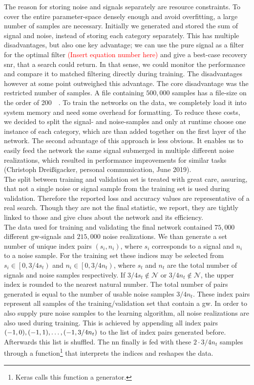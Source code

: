 The reason for storing noise and signals separately are resource constraints. To cover the entire parameter-space densely enough and avoid overfitting, a large number of samples are necessary. Initially we generated and stored the sum of signal and noise, instead of storing each category separately. This has multiple disadvantages, but also one key advantage; we can use the pure signal as a filter for the optimal filter \textcolor{red}{(Insert equation number here)} and give a best-case recovery \gls{snr}, that a search could return. In that sense, we could monitor the performance and compare it to matched filtering directly during training. The disadvantages however at some point outweighed this advantage. The core disadvantage was the restricted number of samples. A file containing $500,000$ samples has a file-size on the order of \SI{200}{\giga\byte}. To train the networks on the data, we completely load it into system memory and need some overhead for formatting. To reduce these costs, we decided to split the signal- and noise-samples and only at runtime choose one instance of each category, which are than added together on the first layer of the network. The second advantage of this approach is less obvious. It enables us to easily feed the network the same signal submerged in multiple different noise realizations, which resulted in performance improvements for similar tasks (Christoph Dreißigacker, personal communication, June 2019).\\
The split between training and validation set is treated with great care, assuring, that not a single noise or signal sample from the training set is used during validation. Therefore the reported loss and accuracy values are representative of a real search. Though they are not the final statistic, we report, they are tightly linked to those and give clues about the network and its efficiency.\\
The data used for training and validating the final network contained $75,000$ different \gls{gw}-signals and $215,000$ noise realizations. We than generate a set number of unique index pairs $(s_i, n_i)$, where $s_i$ corresponds to a signal and $n_i$ to a noise sample. For the training set these indices may be selected from $s_i\in\left[0, 3/4s_t\right)$ and $n_i\in\left[0, 3/4n_t\right)$, where $s_t$ and $n_t$ are the total number of signals and noise samples respectively. If $3/4s_t\notin\mathcal{N}$ or $3/4n_t\notin\mathcal{N}$, the upper index is rounded to the nearest natural number. The total number of pairs generated is equal to the number of usable noise samples $3/4 n_t$. These index pairs represent all samples of the training/validation set that contain a \gls{gw}. In order to also supply pure noise samples to the learning algorithm, all noise realizations are also used during training. This is achieved by appending all index pairs ${\left( -1, 0 \right)}, {\left( -1, 1 \right)}, \dotsc, {\left( -1, 3/4n_t \right)}$ to the list of index pairs generated before. Afterwards this list is shuffled. The \gls{nn} finally is fed with these $2\cdot 3/4 n_t$ samples through a function\footnote{Keras calls this function a generator.} that interprets the indices and reshapes the data.\\

